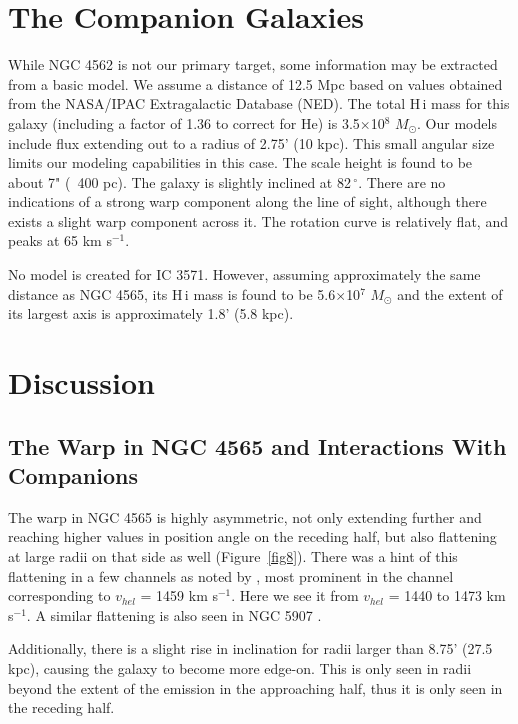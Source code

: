 \documentclass{emulateapj}
\begin{document}
\section{The Companion Galaxies} \label{Section5}
\par
  While NGC 4562 is not our primary target, some information may be extracted from a basic model.  We assume a distance of 12.5 Mpc based on values obtained from the NASA/IPAC Extragalactic Database (NED).  The total {\sc H\,i} mass for this galaxy (including a factor of 1.36 to correct for He) is 3.5$\times$10$^{8}$ $M_{\odot}$.  Our models include flux extending out to a radius of 2.75' (10 kpc).   This small angular size limits our modeling capabilities in this case.  The scale height is found to be about 7" (~400 pc).  The galaxy is slightly inclined at 82$\,^{\circ}$.  There are no indications of a strong warp component along the line of sight, although there exists a slight warp component across it.  The rotation curve is relatively flat, and peaks at 65 km s$^{-1}$. 

\par
    No model is created for IC 3571.  However, assuming approximately the same distance as NGC 4565, its {\sc H\,i} mass is found to be 5.6$\times$10$^{7}$ $M_{\odot}$ and the extent of its largest axis is approximately 1.8' (5.8 kpc). 


\section{Discussion} \label{Section6}

\subsection{The Warp in NGC 4565 and Interactions With Companions} \label{Section6.1}

\par
     The warp in NGC 4565 is highly asymmetric, not only extending further and reaching higher values in position angle on the receding half, but also flattening at large radii on that side as well (Figure~\ref{fig8}).  There was a hint of this flattening in a few channels as noted by \citet{1991AJ....102...48R}, most prominent in the channel corresponding to $v_{hel}$ = 1459 km s$^{-1}$.  Here we see it from $v_{hel}$ = 1440 to 1473 km s$^{-1}$.  A similar flattening is also seen in NGC 5907 \citep{1983IAUS..100...55S}.  

\par
     Additionally, there is a slight rise in inclination for radii larger than 8.75' (27.5 kpc), causing the galaxy to become more edge-on.  This is only seen in radii beyond the extent of the emission in the approaching half, thus it is only seen in the receding half.
\end{document}
